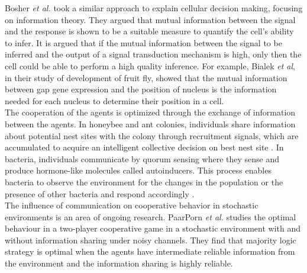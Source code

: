Bosher \textit{et al.} \cite{Bowsher2014} took a similar approach to explain cellular decision making, focusing on information theory. They argued that mutual information between the signal and the response is shown to be a suitable measure to quantify the cell's ability to infer. It is argued that if the mutual information between the signal to be inferred and the output of a signal transduction mechanism is high, only then the cell could be able to perform a high quality inference. For example, Bialek \textit{et al}, in their study of development of fruit fly, showed that the mutual information between gap gene expression and the position of nucleus is the information needed for each nucleus to determine their position in a cell. \\
The cooperation of the agents is optimized through the exchange of information between the agents. In honeybee and ant colonies, individuals share information about potential nest sites with the colony through recruitment signals, which are accumulated to acquire an intelligent collective decision on best nest site \cite{Franks2002}. In bacteria, individuals communicate by quorum sensing where they sense and produce hormone-like molecules called autoinducers. This process enables bacteria to observe the environment for the changes in the population or the presence of other bacteria and respond accordingly \cite{doi:10.1146/annurev.cellbio.21.012704.131001}.\\
The influence of communication on cooperative behavior in stochastic environments is an area of ongoing research. PaarPorn \textit{et al.} \cite{Paarporn2018a} studies the optimal behaviour in a two-player cooperative game in a stochastic environment with and without information sharing under noisy channels. They find that majority logic strategy is optimal when the agents have intermediate reliable information from the environment and the information sharing is highly reliable.

